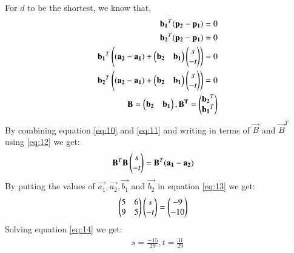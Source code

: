 \documentclass[journal,12pt,twocolumn]{IEEEtran}
\begin{document}
For $d$ to be the shortest, we know that,
\begin{align}
\mathbf{b_1}^T(\mathbf{p_2}-\mathbf{p_1})=0\\
\mathbf{b_2}^T(\mathbf{p_2}-\mathbf{p_1})=0\\
\mathbf{b_1}^T\left((\mathbf{a_2}-\mathbf{a_1})+\begin{pmatrix}\mathbf{b_2}&\mathbf{b_1}\end{pmatrix}\begin{pmatrix}s\\-t\end{pmatrix}\right)=0\label{eq:10}\\
\mathbf{b_2}^T\left((\mathbf{a_2}-\mathbf{a_1})+\begin{pmatrix}\mathbf{b_2}&\mathbf{b_1}\end{pmatrix}\begin{pmatrix}s\\-t\end{pmatrix}\right)=0\label{eq:11}\\
\mathbf{B}= \begin{pmatrix}\mathbf{b_2}&\mathbf{b_1}\end{pmatrix}, \mathbf{B^T}= \begin{pmatrix}\mathbf{b_2}^T\\\mathbf{b_1}^T\end{pmatrix}\label{eq:12}
\end{align}
By combining equation \eqref{eq:10} and \eqref{eq:11} and writing in terms of $\vec{B}$ and $\vec{B}^T$ using \eqref{eq:12} we get:
\begin{align}
\mathbf{B}^T\mathbf{B}\begin{pmatrix}s\\-t\end{pmatrix}&=\mathbf{B}^T(\mathbf{a_1}-\mathbf{a_2})\label{eq:13}
\end{align}
By putting the values of $\vec{a_1}, \vec{a_2}, \vec{b_1}$ and $\vec{b_2}$ in equation \eqref{eq:13} we get:
\begin{align}
\begin{pmatrix}5&6\\9&5\end{pmatrix}\begin{pmatrix}s\\-t\end{pmatrix}&=\begin{pmatrix}-9\\-10\end{pmatrix}\label{eq:14}\label{eq:14}
\end{align}
Solving equation \eqref{eq:14} we get:
\begin{align}
    s=\frac{-15}{29}, t=\frac{31}{29}
\end{align}
\end{document}

